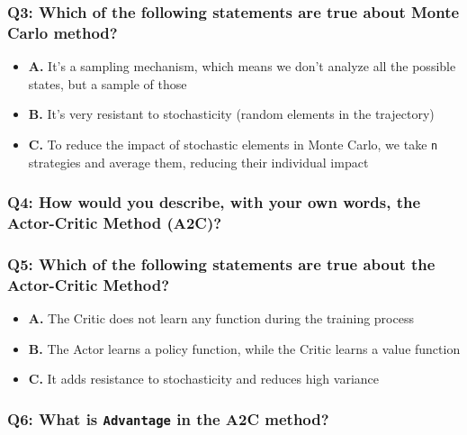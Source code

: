 \documentclass[11pt,a4paper]{article}
\begin{document}
\subsubsection{Q3: Which of the following statements are true about Monte Carlo method?}\label{q3-which-of-the-following-statements-are-true-about-monte-carlo-method}

\begin{itemize}
\tightlist
\item
  \textbf{A.} It's a sampling mechanism, which means we don't analyze all the possible states, but a sample of those
\item
  \textbf{B.} It's very resistant to stochasticity (random elements in the trajectory)
\item
  \textbf{C.} To reduce the impact of stochastic elements in Monte Carlo, we take \texttt{n} strategies and average them, reducing their individual impact
\end{itemize}

\subsubsection{Q4: How would you describe, with your own words, the Actor-Critic Method (A2C)?}\label{q4-how-would-you-describe-with-your-own-words-the-actor-critic-method-a2c}

\subsubsection{Q5: Which of the following statements are true about the Actor-Critic Method?}\label{q5-which-of-the-following-statements-are-true-about-the-actor-critic-method}

\begin{itemize}
\tightlist
\item
  \textbf{A.} The Critic does not learn any function during the training process
\item
  \textbf{B.} The Actor learns a policy function, while the Critic learns a value function
\item
  \textbf{C.} It adds resistance to stochasticity and reduces high variance
\end{itemize}

\subsubsection{\texorpdfstring{Q6: What is \texttt{Advantage} in the A2C method?}{Q6: What is Advantage in the A2C method?}}\label{q6-what-is-advantage-in-the-a2c-method}
\end{document}
